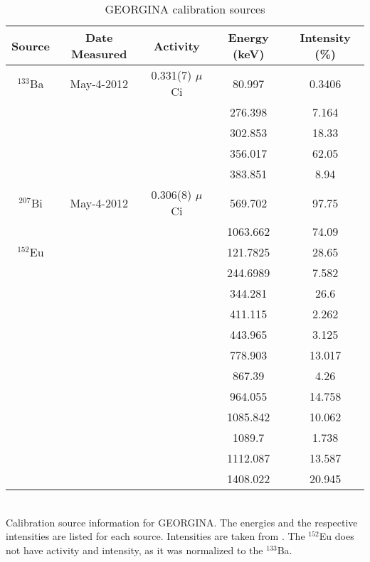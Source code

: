 \begin{table}[]
    \centering
    \small
    \caption{GEORGINA calibration sources}
        \label{tab:GEORGINA_Cal_Source}
    \begin{tabular}{c|c|c|c|c} \toprule
         Source & Date Measured & Activity & Energy (keV) & Intensity (\%)\\
          \hline 
         $^{133}$Ba & May-4-2012 & 0.331(7) $\mu$Ci & 80.997 & 0.3406 \\
         & & & 276.398 & 7.164 \\
         & & & 302.853 & 18.33 \\
         & & & 356.017 & 62.05 \\
         & & & 383.851 & 8.94 \\
         \hline
         $^{207}$Bi & May-4-2012 & 0.306(8) $\mu$Ci & 569.702 & 97.75 \\ 
         & & & 1063.662 & 74.09 \\
         \hline
         $^{152}$Eu & & & 121.7825 & 28.65 \\
         & & & 244.6989 & 7.582 \\
         & & & 344.281 & 26.6 \\
         & & & 411.115 & 2.262 \\
         & & & 443.965 & 3.125 \\
         & & & 778.903 & 13.017 \\
         & & & 867.39 & 4.26 \\
         & & & 964.055 & 14.758 \\
         & & & 1085.842 & 10.062 \\
         & & & 1089.7 & 1.738 \\
         & & & 1112.087 & 13.587 \\
         & & & 1408.022 & 20.945 \\\bottomrule
    \end{tabular}
    \\[2]
    \footnotesize
    Calibration source information for GEORGINA. The energies and the respective intensities are listed for each source. Intensities are taken from \cite{trzaska90:_calibration}. The  $^{152}$Eu does not have activity and intensity, as it was normalized to the $^{133}$Ba.
\end{table}